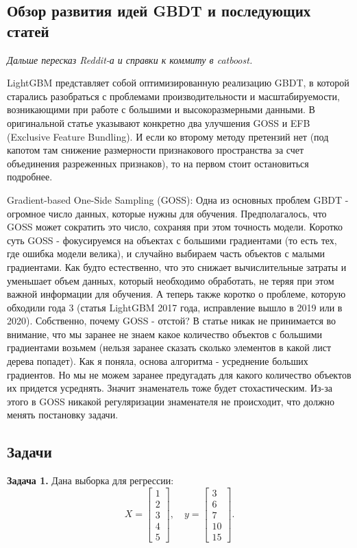 \subsection*{Обзор развития идей GBDT и последующих статей}

\hspace{1.5em}\textit{Дальше пересказ Reddit-а и справки к коммиту в catboost.}
\vspace{1cm}

LightGBM представляет собой оптимизированную реализацию GBDT, в которой старались разобраться с проблемами производительности и масштабируемости, возникающими при работе с большими и высокоразмерными данными. В оригинальной статье указывают конкретно два улучшения GOSS и EFB (Exclusive Feature Bundling). И если ко второму методу претензий нет (под капотом там снижение размерности признакового пространства за счет объединения разреженных признаков), то на первом стоит остановиться подробнее.

Gradient-based One-Side Sampling (GOSS):
Одна из основных проблем GBDT - огромное число данных, которые нужны для обучения. Предполагалось, что GOSS может сократить это число, сохраняя при этом точность модели. Коротко суть GOSS - фокусируемся на объектах с большими градиентами (то есть тех, где ошибка модели велика), и случайно выбираем часть объектов с малыми градиентами. Как будто естественно, что это снижает вычислительные затраты и уменьшает объем данных, который необходимо обработать, не теряя при этом важной информации для обучения. А теперь также коротко о проблеме, которую обходили года 3 (статья LightGBM 2017 года, исправление вышло в 2019 или в 2020). Собственно, почему GOSS - отстой? В статье никак не принимается во внимание, что мы заранее не знаем какое количество объектов с большими градиентами возьмем (нельзя заранее сказать сколько элементов в какой лист дерева попадет). Как я поняла, основа алгоритма - усреднение больших градиентов. Но мы не можем заранее предугадать для какого количество объектов их придется усреднять. Значит знаменатель тоже будет стохастическим. Из-за этого в GOSS никакой регуляризации знаменателя не происходит, что должно менять постановку задачи.

\subsection*{Задачи}

\textbf{Задача 1.}
Дана выборка для регрессии:
\[
    X = \begin{bmatrix} 1 \\ 2 \\ 3 \\ 4 \\ 5 \end{bmatrix}, \quad y = \begin{bmatrix} 3 \\ 6 \\ 7 \\ 10 \\ 15 \end{bmatrix}.
\]

